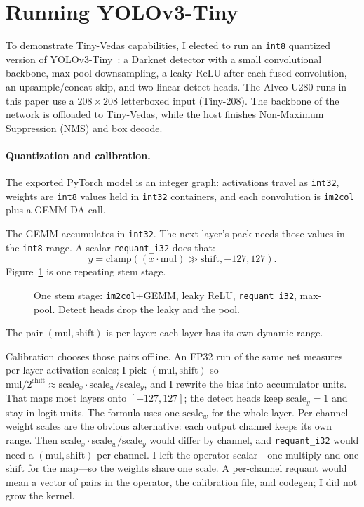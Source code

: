 \section{Running {YOLOv3-Tiny}}
\label{sec:example}

To demonstrate Tiny-Vedas capabilities, I elected to
run an \texttt{int8} quantized version of {YOLOv3-Tiny}~\cite{redmon2018yolov3}: a Darknet detector with
a small convolutional backbone, max-pool downsampling, a leaky {ReLU}
after each fused convolution, an upsample/concat skip, and two linear
detect heads.
The Alveo U280 runs in this paper use a $208{\times}208$ letterboxed input
(Tiny-208). The backbone of the network is offloaded to Tiny-Vedas, while the host finishes Non-Maximum Suppression ({NMS}) 
and box decode.

\paragraph{Quantization and calibration.}
The exported {PyTorch} model is an integer graph: activations travel as
\texttt{int32}, weights are \texttt{int8} values held in
\texttt{int32} containers, and each convolution is
\texttt{im2col} plus a {GEMM} {DA} call.

The {GEMM} accumulates in \texttt{int32}.
The next layer's pack needs those values in the \texttt{int8} range.
A scalar \texttt{requant\_i32} does that:
\begin{equation*}
  y=\mathrm{clamp}((x{\cdot}\mathrm{mul}){\gg}\mathrm{shift},-127,127).
\end{equation*}
Figure~\ref{fig:yolo-stage} is one repeating stem stage.

\begin{figure}[H]
  \centering
  \setlength{\intextsep}{4pt}%
  
  \caption{One stem stage: \texttt{im2col}+{GEMM}, leaky {ReLU},
    \texttt{requant\_i32}, max-pool.
    Detect heads drop the leaky and the pool.}
  \label{fig:yolo-stage}
\end{figure}

The pair $(\mathrm{mul},\mathrm{shift})$ is per layer: each layer has
its own dynamic range.

Calibration chooses those pairs offline.
An {FP32} run of the same net measures per-layer activation scales;
I pick $(\mathrm{mul},\mathrm{shift})$ so
$\mathrm{mul}/2^{\mathrm{shift}}\approx
\mathrm{scale}_x{\cdot}\mathrm{scale}_w/\mathrm{scale}_y$,
and I rewrite the bias into accumulator units.
That maps most layers onto $[-127,127]$;
the detect heads keep $\mathrm{scale}_y{=}1$ and stay in logit units.
The formula uses one $\mathrm{scale}_w$ for the whole layer.
Per-channel weight scales are the obvious alternative: each output
channel keeps its own range.
Then $\mathrm{scale}_x{\cdot}\mathrm{scale}_w/\mathrm{scale}_y$ would
differ by channel, and \texttt{requant\_i32} would need a
$(\mathrm{mul},\mathrm{shift})$ per channel.
I left the operator scalar---one multiply and one shift for the
map---so the weights share one scale.
A per-channel requant would mean a vector of pairs in the operator,
the calibration file, and codegen; I did not grow the kernel.

